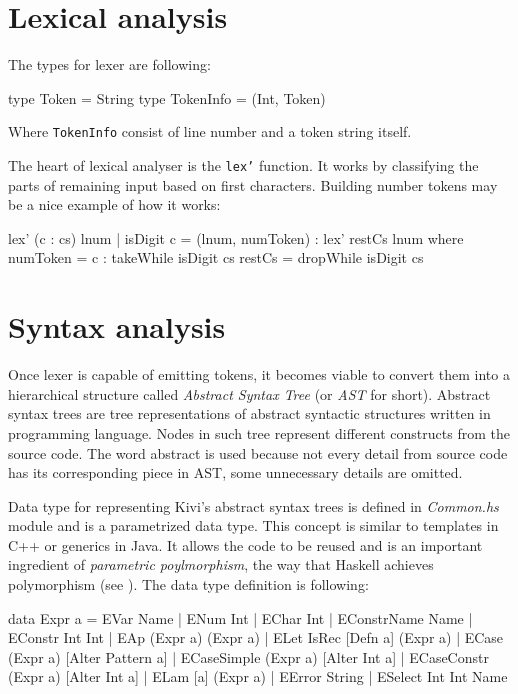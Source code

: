 \documentclass[12pt,a4paper]{report}
\begin{document}
\section{Lexical analysis}

The types for lexer are following:

\vspace*{0.2in}
\begin{code}[style=haskell]
type Token = String
type TokenInfo = (Int, Token)
\end{code}

Where \texttt{TokenInfo} consist of line number and a token string itself.

The heart of lexical analyser is the \texttt{lex'} function. It works by
classifying the parts of remaining input based on first characters.  Building
number tokens may be a nice example of how it works:

\vspace*{0.2in}
\begin{code}[style=haskell,label=lst:lex_comment,caption={Building tokens from numbers.}]
lex' (c : cs) lnum | isDigit c =
    (lnum, numToken) : lex' restCs lnum
    where
        numToken = c : takeWhile isDigit cs
        restCs = dropWhile isDigit cs
\end{code}


\section{Syntax analysis}
\label{sec:syntax_analysis}
Once lexer is capable of emitting tokens, it becomes viable to convert them
into a hierarchical structure called \textit{Abstract Syntax Tree} (or
\textit{AST} for short). Abstract syntax trees are tree representations of
abstract syntactic structures written in programming language. Nodes in such
tree represent different constructs from the source code. The word abstract is
used because not every detail from source code has its corresponding piece in
AST, some unnecessary details are omitted.

Data type for representing Kivi's abstract syntax trees is defined in
\textit{Common.hs} module and is a parametrized data type. This concept is
similar to templates in C++ or generics in Java. It allows the code to be
reused and is an important ingredient of \textit{parametric poylmorphism}, the
way that Haskell achieves polymorphism (see
\cite{website:parametric_polymorphism}). The data type definition is following:

\vspace*{0.2in}
\begin{code}[style=haskell]
data Expr a = EVar Name
            | ENum Int
            | EChar Int
            | EConstrName Name
            | EConstr Int Int
            | EAp (Expr a) (Expr a)
            | ELet IsRec [Defn a] (Expr a)
            | ECase (Expr a) [Alter Pattern a]
            | ECaseSimple (Expr a) [Alter Int a]
            | ECaseConstr (Expr a) [Alter Int a]
            | ELam [a] (Expr a)
            | EError String
            | ESelect Int Int Name
\end{code}
\end{document}
